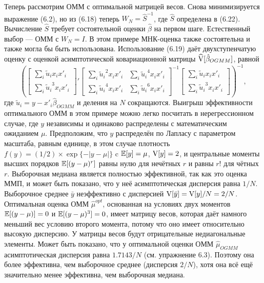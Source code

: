 Теперь рассмотрим ОММ с оптимальной матрицей весов. Снова минимизируется выражение (6.2), но из (6.18) теперь $W_N={\hat{S}}^{-1}$, где $\hat{S}$ определена в (6.22). Вычисление $\hat{S}$ требует состоятельной оценки $\hat{\beta}$ на первом шаге. Естественный выбор --- ОММ с $W_N=I$. 
В этом примере МНК-оценка также состоятельна и также могла бы быть использована. Использование (6.19) даёт двухступенчатую оценку с оценкой асимптотической ковариационной матрицы $\widehat{\mathrm{V}}[\hat{\beta}_{OGMM}]$, равной
\[
\left( \begin{bmatrix} \sum_i \tilde{u}_i x_i x'_i \\ \sum_i {\tilde{u}_i}^3 x_i x'_i \end{bmatrix}' \begin{bmatrix} \sum_i {\tilde{u}_i}^2 x_i x'_i & \sum_i {\tilde{u}_i}^4 x_i x'_i \\  \sum_i {\tilde{u}_i}^4 x_i x'_i & \sum_i {\tilde{u}_i}^6 x_i x'_i \end{bmatrix}^{-1} \begin{bmatrix} \sum_i \tilde{u}_i x_i x'_i \\ \sum_i {\tilde{u}_i}^3 x_i x'_i \end{bmatrix} \right)^{-1},
\]
где $\tilde{u}_i=y-x'_i \hat{\beta}_{OGMM}$ и деления на $N$ сокращаются. Выигрыш эффективности оптимального ОММ в этом примере можно легко посчитать в нерегрессионном случае, где $y$ независимы и одинаково распределены с математическим ожиданием $\mu$. Предположим, что $y$ распределён по Лапласу с параметром масштаба, равным единице, в этом случае плотность $f(y)=(1/2) \times \exp \{-|y-\mu| \}$ c $\mathbb{E}[y]=\mu$, $\mathrm{V}[y]=2$, и центральные моменты высших порядков $\mathbb{E}[(y-\mu)^{r}]$ равны нулю для нечётных $r$ и равны $r!$ для чётных $r$. Выборочная медиана является полностью эффективной, так как это оценка ММП, и может быть показано, что у неё асимптотическая дисперсия равна $1/N$. Выборочное среднее $\bar{y}$ неэффективно с дисперсией $\mathrm{V}[\bar{y}]=\mathrm{V}[y]/N=2/N$. Оптимальная оценка ОММ $\hat{\mu}^{opt}$, основанная на условиях двух моментов $\mathbb{E}[(y-\mu)]=0$ и $\mathbb{E}[(y-\mu)^3]=0$, имеет матрицу весов, которая даёт намного меньший вес условию второго момента, потому что оно имеет относительно высокую дисперсию. У матрицы весов будут отрицательные недиагональные элементы. Может быть показано, что у оптимальной оценки ОММ $\hat{\mu}_{OGMM}$ асимптотическая дисперсия равна $1.7143/N$ (см. упражнение 6.3). Поэтому она более эффективна, чем выборочное среднее (дисперсия $2/N$), хотя она всё ещё значительно менее эффективна, чем выборочная медиана.

